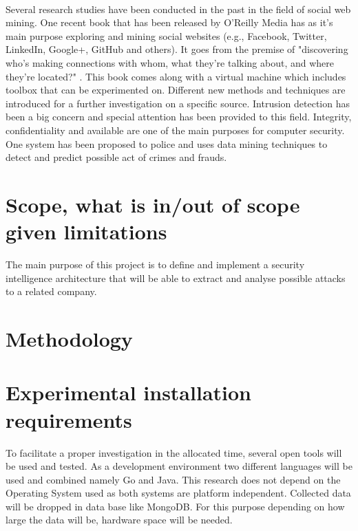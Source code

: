 \documentclass[12pt]{article}
\begin{document}
\paragraph{}
Several research studies have been conducted in the past in the field of social web mining. One recent book that has been released by  O'Reilly Media has as it's main purpose exploring and mining social websites (e.g., Facebook, Twitter, LinkedIn, Google+, GitHub and others). It goes from the premise of "discovering who’s making connections with whom, what they’re talking about, and where they’re located?" \cite{first}. This book comes along with a virtual machine which includes toolbox that can be experimented on\cite{second}. Different new methods and techniques are introduced for a further investigation on a specific source. Intrusion detection\cite{intrusion-detection} has been a big concern and special attention has been provided to this field. Integrity, confidentiality and available are one of the main purposes for computer security.  One system\cite{third} has been proposed to police and uses data mining techniques to  detect and predict possible act of crimes and frauds. 


\section{Scope, what is in/out of scope given limitations}

The main purpose of this project is to define and implement a security intelligence architecture that will be able to extract and analyse possible attacks to a related company. 

 
\section{Methodology}


\section{Experimental installation requirements}

To facilitate a proper investigation in the allocated time, several open tools will be used and tested. As a development environment two different languages will be used and combined namely Go and Java. This research does not depend on the Operating System used as both systems are platform independent. Collected data will be dropped in data base like MongoDB. For this purpose depending on how large the data will be, hardware space will be needed.
\end{document}
